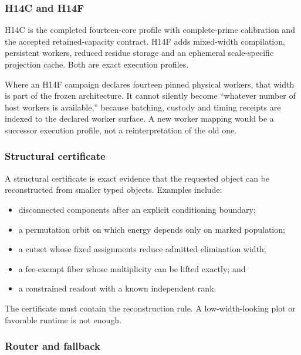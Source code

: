 \subsubsection{H14C and H14F}\label{viii-ch01-h14c-and-h14f}

H14C is the completed fourteen-core profile with complete-prime
calibration and the accepted retained-capacity contract. H14F adds
mixed-width compilation, persistent workers, reduced residue storage and
an ephemeral scale-specific projection cache. Both are exact execution
profiles.

Where an H14F campaign declares fourteen pinned physical workers, that
width is part of the frozen architecture. It cannot silently become
``whatever number of host workers is available,'' because batching,
custody and timing receipts are indexed to the declared worker surface.
A new worker mapping would be a successor execution profile, not a
reinterpretation of the old one.

\subsubsection{Structural certificate}\label{viii-ch01-structural-certificate}

A structural certificate is exact evidence that the requested object can
be reconstructed from smaller typed objects. Examples include:

\begin{itemize}
\tightlist
\item
  disconnected components after an explicit conditioning boundary;
\item
  a permutation orbit on which energy depends only on marked population;
\item
  a cutset whose fixed assignments reduce admitted elimination width;
\item
  a fee-exempt fiber whose multiplicity can be lifted exactly; and
\item
  a constrained readout with a known independent rank.
\end{itemize}

The certificate must contain the reconstruction rule. A
low-width-looking plot or favorable runtime is not enough.

\subsubsection{Router and fallback}\label{viii-ch01-router-and-fallback}

